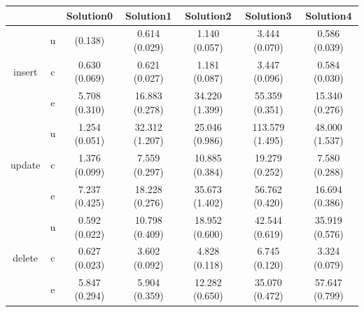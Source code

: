 \newcommand{\B}[1]{\colorbox{light-gray}{#1}}
\begin{tabular}{ccccccc}
\toprule
&&Solution0 & Solution1 & Solution2 & Solution3 & Solution4\\
\midrule
\multirow{3}{*}{insert} & u & \rc 0.624 (0.138) & 0.614 (0.029) & 1.140 (0.057)
& 3.444 (0.070) & 0.586 (0.039)\\
 & c & 0.630 (0.069) & 0.621 (0.027) & 1.181 (0.087) & 3.447 (0.096) & 0.584 (0.030)\\
 & e & 5.708 (0.310) & 16.883 (0.278) & 34.220 (1.399) & 55.359 (0.351) & 15.340 (0.276)\\
\midrule
\multirow{3}{*}{update} & u & 1.254 (0.051) & 32.312 (1.207) & 25.046
(0.986) & 113.579 (1.495) & 48.000 (1.537)\\
 & c & 1.376 (0.099) & 7.559 (0.297) & 10.885 (0.384) & 19.279 (0.252) & 7.580 (0.288)\\
 & e & 7.237 (0.425) & 18.228 (0.276) & 35.673 (1.402) & 56.762 (0.420) & 16.694 (0.386)\\
\midrule
\multirow{3}{*}{delete} & u & 0.592 (0.022) & 10.798 (0.409) & 18.952
(0.600) & 42.544 (0.619) & 35.919 (0.576)\\
 & c & 0.627 (0.023) & 3.602 (0.092) & 4.828 (0.118) & 6.745 (0.120) & 3.324 (0.079)\\
 & e & 5.847 (0.294) & 5.904 (0.359) & 12.282 (0.650) & 35.070 (0.472) & 57.647 (0.799)\\
\bottomrule
\end{tabular}


